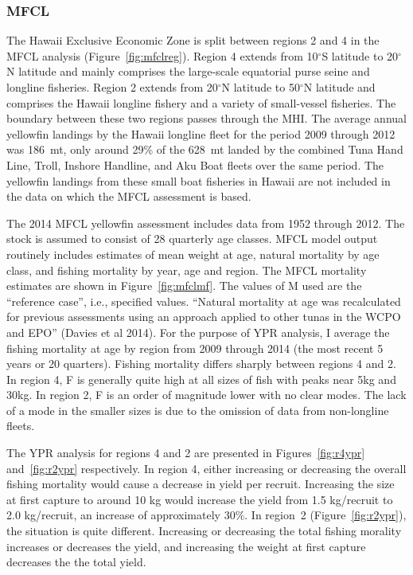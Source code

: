 \documentclass[12pt,letterpaper,twoside]{article}
\renewcommand\deg[1]{$^\circ$#1}
\newcommand\help[1]{\color{Magenta}{\it #1 }\normalcolor}
\begin{document}
\subsubsection*{MFCL}
The Hawaii Exclusive Economic Zone is split between regions 2 and 4
in the MFCL analysis (Figure~\ref{fig:mfclreg}). 
Region 4 extends from
10\deg{S} latitude to 20\deg{N} latitude and mainly comprises 
the large-scale equatorial purse seine and longline fisheries.
Region 2 extends from 20\deg{N} latitude to 50\deg{N} latitude
and comprises the Hawaii longline fishery and a variety of
small-vessel fisheries.
The boundary between these two regions passes through the MHI. 
The average annual yellowfin landings by the Hawaii longline fleet for
the period 2009 through 2012 was 186~mt, only around 29\% of the
628~mt landed by the combined Tuna Hand Line, Troll, Inshore Handline, and Aku
Boat fleets over the same period.
The yellowfin landings from these small boat fisheries in Hawaii are not
included in the data on which the MFCL assessment is based.



The 2014 MFCL yellowfin assessment includes data from 1952 through
2012. The stock is assumed to consist of 28 quarterly age classes. 
MFCL model output routinely includes estimates of mean weight at age,
natural mortality by age class, and fishing mortality by year, age
and region. 
The MFCL mortality estimates are shown in Figure~\ref{fig:mfclmf}. 
The values of M used are the ``reference case'', i.e.,
specified values.
``Natural mortality at age was recalculated for previous assessments
using an approach applied to other tunas in the WCPO and EPO'' 
(Davies et al 2014).
For the purpose of YPR analysis, I average the fishing
mortality at age by region from 2009 through 2014 (the most recent 5
years or 20 quarters). 
Fishing mortality differs sharply between regions 4 and 2. In region
4, F is generally quite high at all sizes of fish with peaks near 5kg
and 30kg.
In region 2, F is an order of magnitude lower with no clear
modes. The lack of a mode in the smaller sizes is due to the omission
of data from non-longline fleets.

The YPR analysis for regions 4 and 2 are
presented in Figures~\ref{fig:r4ypr} and~\ref{fig:r2ypr} respectively.
In region 4, either increasing or decreasing the overall fishing
mortality would cause a decrease in yield per recruit.
Increasing the size at first capture to around 10 kg would increase the
yield from 1.5 kg/recruit to 2.0
kg/recruit, an increase of approximately 30\%.
In region~2 (Figure~\ref{fig:r2ypr}), the situation is quite different. 
Increasing or decreasing the total fishing morality increases
or decreases the yield, and
increasing the weight at first capture decreases the
the total yield.
\end{document}
